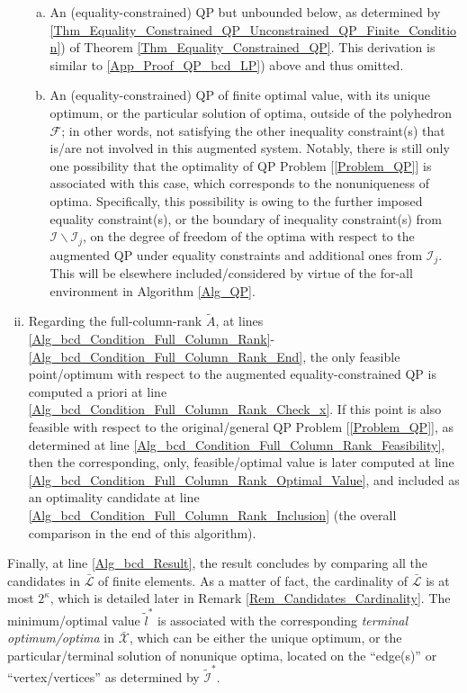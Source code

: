 \documentclass[9pt,twocolumn,twoside,lineno]{pnas-new-1}
\newcommand{\calF}{{\mathcal F}}
\newcommand{\calI}{{\mathcal I}}
\newcommand{\calL}{{\mathcal L}}
\newcommand{\calX}{{\mathcal X}}
\theoremstyle{remark}
\begin{document}
\begin{enumerate}[i)]
\begin{enumerate}[a)]
    \item An (equality-constrained) QP but unbounded below, as determined by \ref{Thm_Equality_Constrained_QP_Unconstrained_QP_Finite_Condition}) of Theorem \ref{Thm_Equality_Constrained_QP}. This derivation is similar to \ref{App_Proof_QP_bcd_LP}) above and thus omitted.
    \item\label{App_Proof_QP_bcd_QP_bounded} An (equality-constrained) QP of finite optimal value, with its unique optimum, or the particular solution of optima, outside of the polyhedron $\calF$; in other words, not satisfying the other inequality constraint(s) that is/are not involved in this augmented system. Notably, there is still only one possibility that the optimality of QP Problem [\ref{Problem_QP}] is associated with this case, which corresponds to the nonuniqueness of optima. Specifically, this possibility is owing to the further imposed equality constraint(s), or the boundary of inequality constraint(s) from $\calI\backslash\calI_j$, on the degree of freedom of the optima with respect to the augmented QP under equality constraints and additional ones from $\calI_j$. This will be elsewhere included/considered by virtue of the for-all environment in Algorithm \ref{Alg_QP}.
    \end{enumerate}
\item Regarding the full-column-rank $\tilde A$, at lines \ref{Alg_bcd_Condition_Full_Column_Rank}-\ref{Alg_bcd_Condition_Full_Column_Rank_End}, the only feasible point/optimum with respect to the augmented equality-constrained QP is computed a priori at line \ref{Alg_bcd_Condition_Full_Column_Rank_Check_x}. If this point is also feasible with respect to the original/general QP Problem [\ref{Problem_QP}], as determined at line \ref{Alg_bcd_Condition_Full_Column_Rank_Feasibility}, then the corresponding, only, feasible/optimal value is later computed at line \ref{Alg_bcd_Condition_Full_Column_Rank_Optimal_Value}, and included as an optimality candidate at line \ref{Alg_bcd_Condition_Full_Column_Rank_Inclusion} (the overall comparison in the end of this algorithm).
\end{enumerate}

Finally, at line \ref{Alg_bcd_Result}, the result concludes by comparing all the candidates in $\bar\calL$ of finite elements. As a matter of fact, the cardinality of $\bar\calL$ is at most $2^\kappa$, which is detailed later in Remark \ref{Rem_Candidates_Cardinality}. The minimum/optimal value $\tilde l^*$ is associated with the corresponding \textit{terminal optimum/optima} in $\bar\calX$, which can be either the unique optimum, or the particular/terminal solution of nonunique optima, located on the ``edge(s)'' or ``vertex/vertices'' as determined by $\tilde\calI^*$.
\end{document}
